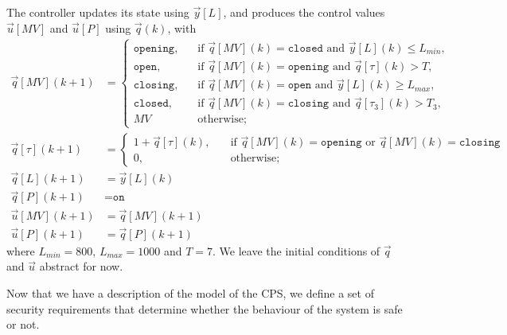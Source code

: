The controller updates its state using $\vec{y}[L]$, and produces the control values $\vec{u}[MV]$ and $\vec{u}[P]$ using $\vec{q}(k)$, with 
\begin{align}
  \label{eq:ControllerStage3}
  \vec{q}[MV](k+1)&=
  \begin{cases}
    \texttt{opening},&\quad \text{if $\vec{q}[MV](k)=\texttt{closed}$ and $\vec{y}[L](k)\leq L_{min}$,}\\
    \texttt{open},&\quad \text{if $\vec{q}[MV](k)=\texttt{opening}$ and $\vec{q}[\tau](k)>T$,}\\
    \texttt{closing},&\quad \text{if $\vec{q}[MV](k)=\texttt{open}$ and $\vec{y}[L](k)\geq L_{max}$,}\\
    \texttt{closed},&\quad \text{if $\vec{q}[MV](k)=\texttt{closing}$ and $\vec{q}[\tau_3](k) >T_3$,}\\
    MV&\quad \text{otherwise;}    
  \end{cases}\\
  \vec{q}[\tau](k+1)&=
\begin{cases}
  1+\vec{q}[\tau](k), &\quad \text{if $\vec{q}[MV](k)=\texttt{opening}$ or $\vec{q}[MV](k)=\texttt{closing}$}\\
  0,&\quad \text{otherwise;}    
\end{cases}\\
\vec{q}[L](k+1)&=\vec{y}[L](k)\\
\vec{q}[P](k+1)&=\texttt{on}\\
\vec{u}[MV](k+1)&=\vec{q}[MV](k+1)\\
\vec{u}[P](k+1)&=\vec{q}[P](k+1)
\end{align}
where $L_{min}=800$, $L_{max}=1000$ and $T=7$. We leave the initial conditions of $\vec{q}$ and $\vec{u}$ abstract for now.

Now that we have a description of the model of the CPS, we define a set of security requirements that determine whether the behaviour of the system is safe or not.

